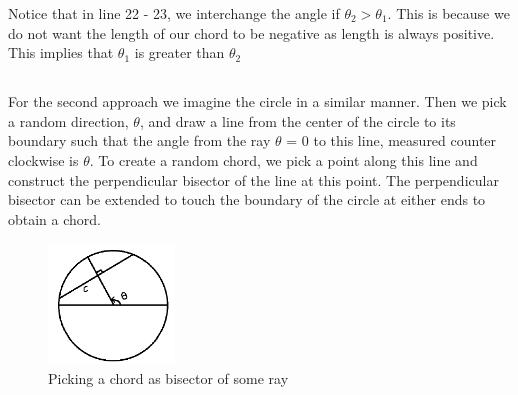 \documentclass[answers]{exam}
\begin{document}
\begin{framed}
Notice that in line 22 - 23, we interchange the angle if $\theta_2 > \theta_1$. This is because we do not want the length of our chord to be negative as length is always positive. This implies that $\theta_1$ is greater than $\theta_2$

\end{framed}

\subsection{} For the second approach we imagine the circle in a similar manner. Then we pick a random direction, $\theta$, and draw a line from the center of the circle to its boundary such that the angle from the ray $\theta$ = 0 to this line, measured counter clockwise is $\theta$. To create a random chord, we pick a point along this
line and construct the perpendicular bisector of the line at this point. The perpendicular bisector can be extended to touch the boundary of the circle at either ends to obtain a chord.

\begin{figure}[H] %
    \centering
    \includegraphics[width= 0.3\textwidth]{Q4.2.PNG}
    \caption{Picking a chord as bisector of some ray}
\end{figure}
\end{document}
